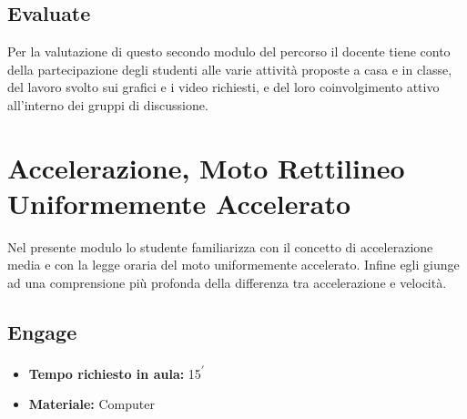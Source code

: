 \documentclass{report} \usepackage[T1]{fontenc} \usepackage[italian]{babel}
\begin{document}
\section{Evaluate}
Per la valutazione di questo secondo modulo del percorso il docente tiene conto della
partecipazione degli studenti alle varie attività proposte a casa e in classe,
del lavoro svolto sui grafici e i video richiesti, e del loro coinvolgimento attivo
all’interno dei gruppi di discussione.

\chapter{Accelerazione, Moto Rettilineo Uniformemente Accelerato}
Nel presente modulo lo studente familiarizza con il concetto di accelerazione
media e con la legge oraria del moto uniformemente accelerato.
Infine egli giunge ad una comprensione più profonda della differenza
tra accelerazione e velocità.

\section{Engage}

\begin{itemize}
\item \textbf{Tempo richiesto in aula:} 15\textsuperscript{$\prime$}
\item \textbf{Materiale:} Computer
\end{itemize}
\end{document}
